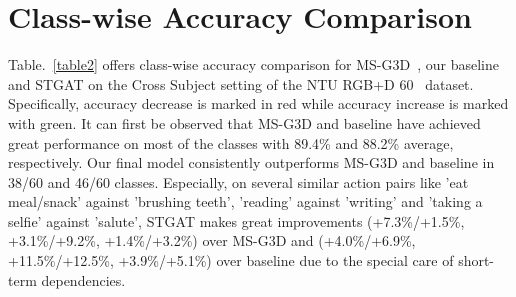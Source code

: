 \documentclass[runningheads]{llncs}
\begin{document}
\section{Class-wise Accuracy Comparison}
Table.~\ref{table2} offers class-wise accuracy comparison for MS-G3D~\cite{liu2020disentangling}, our baseline and STGAT on the Cross Subject setting of the NTU RGB+D 60~\cite{shahroudy2016ntu} dataset. Specifically, accuracy decrease is marked in red while accuracy increase is marked with green. It can first be observed that MS-G3D and baseline have achieved great performance on most of the classes with 89.4\% and 88.2\% average, respectively. Our final model consistently outperforms MS-G3D and baseline in 38/60 and 46/60 classes. Especially, on several similar action pairs like 'eat meal/snack' against 'brushing teeth', 'reading' against 'writing' and 'taking a selfie' against 'salute', STGAT makes great improvements (+7.3\%/+1.5\%, +3.1\%/+9.2\%, +1.4\%/+3.2\%) over MS-G3D and (+4.0\%/+6.9\%, +11.5\%/+12.5\%, +3.9\%/+5.1\%) over baseline due to the special care of short-term dependencies.
\end{document}
